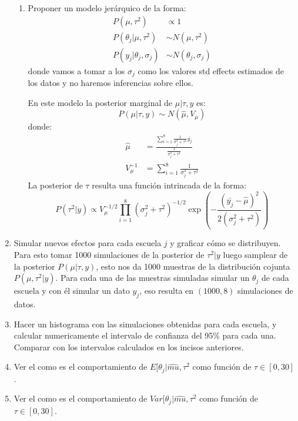 \documentclass[12pt]{paper}
\begin{document}
\begin{enumerate}
\begin{enumerate}
\item Proponer un modelo jerárquico de la forma:
\begin{align*}
P(\mu,\tau^{2}) &\propto 1\\
P(\theta_{j}|\mu,\tau^{2}) &\sim N(\mu,\tau^{2})\\
P(y_{j}|\theta_{j},\sigma_{j}) &\sim N(\theta_{j},\sigma_{j})
\end{align*}
donde vamos a tomar a los $\sigma_{j}$ como los valores std effects estimados de los datos y no haremos inferencias sobre ellos.

En este modelo la posterior marginal de $\mu|\tau,y$ es:
\begin{equation}
P(\mu|\tau,y) \sim N(\hat{\mu},V_{\mu})
\end{equation}
donde:
\begin{align}
\hat{\mu} &= \frac{\sum_{i =1}^{8}\frac{1}{\sigma_{j}^{2}+ \tau^{2}}\bar{y_{j}}}{\frac{1}{\sigma_{j}^{2}+ \tau^{2}}} \\
V_{\mu}^{-1} &= \sum_{i=1}^{8}\frac{1}{\sigma_{j}^{2} + \tau^{2}}
\end{align}
La posterior de $\tau$ resulta una función intrincada de la forma:
\begin{equation}
P(\tau^{2}|y) \propto V_{\mu}^{-1/2} \prod_{i=1}^{8} (\sigma_{j}^{2}+ \tau^{2})^{-1/2} \exp \left(-\frac{(\bar{y_{j}} - \hat{\mu})^{2}}{2(\sigma^{2}_{j}+\tau^{2})}\right)
\end{equation}
\end{enumerate}

\item Simular nuevos efectos para cada escuela $j$ y graficar cómo se distribuyen. Para esto tomar 1000 simulaciones de la posterior de $\tau^{2}|y$ luego samplear de la posterior $P(\mu|\tau,y)$, esto nos da 1000 muestras de la distribución cojunta $P(\mu,\tau^{2}|y)$. Para cada una de las muestras simuladas simular un $\theta_{j}$ de cada escuela y con él simular un dato $y_{j}$, eso resulta en $(1000,8)$ simulaciones de datos. 
\item Hacer un histograma con las simulaciones obtenidas para cada escuela, y calcular numericamente el intervalo de confianza del 95\% para cada una. Comparar con los intervalos calculados en los incisos anteriores.
\item Ver el como es el comportamiento de $E[\theta_{j}|\hat{mu},\tau^{2}$ como función de $\tau \in [0,30]$.
\item Ver el como es el comportamiento de $Var[\theta_{j}|\hat{mu},\tau^{2}$ como función de $\tau \in [0,30]$.
\end{enumerate}

\pagestyle{empty}
\end{document}
